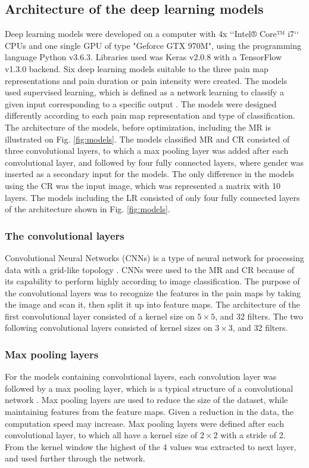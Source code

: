 \subsection{Architecture of the deep learning models}
Deep learning models were developed on a computer with 4x ‘‘Intel® Core™ i7‘‘ CPUs and one single GPU of type "Geforce GTX 970M", using the programming language Python v3.6.3. Libraries used was Keras v2.0.8 with a TensorFlow v1.3.0 backend.\newline
\noindent
Six deep learning models suitable to the three pain map representations and pain duration or pain intensity were created. The models used supervised learning, which is defined as a network learning to classify a given input corresponding to a specific output \citep{Goodfellow2016}. The models were designed differently according to each pain map representation and type of classification. The architecture of the models, before optimization, including the MR is illustrated on Fig. \ref{fig:models}. The models classified MR and CR consisted of three convolutional layers, to which a max pooling layer was added after each convolutional layer, and followed by four fully connected layers, where gender was inserted as a secondary input for the models. The only difference in the models using the CR was the input image, which was represented a matrix with 10 layers. 
The models including the LR consisted of only four fully connected layers of the architecture shown in Fig. \ref{fig:models}. 

\subsubsection{The convolutional layers}
Convolutional Neural Networks (CNNs) is a type of neural network for processing data with a grid-like topology \citep{Goodfellow2016}. CNNs were used to the MR and CR because of its capability to perform highly according to image classification. The purpose of the convolutional layers was to recognize the features in the pain maps by taking the image and scan it, then split it up into feature maps.\citep{Goodfellow2016,LeCun1998} The architecture of the first convolutional layer consisted of a kernel size on $5 \times 5$, and 32 filters. The two following convolutional layers consisted of kernel sizes on $3 \times 3$, and 32 filters. 

\subsubsection{Max pooling layers}
For the models containing convolutional layers, each convolution layer was followed by a max pooling layer, which is a typical structure of a convolutional network \citep{Goodfellow2016, LeCun2015}.
Max pooling layers are used to reduce the size of the dataset, while maintaining features from the feature maps. Given a reduction in the data, the computation speed may increase.\citep{Goodfellow2016,LeCun1998} 
Max pooling layers were defined after each convolutional layer, to which all have a kernel size of $2 \times 2$ with a stride of 2. From the kernel window the highest of the 4 values was extracted to next layer, and used further through the network. 

